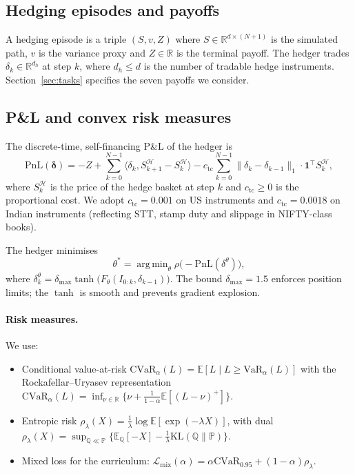 \documentclass[11pt,a4paper]{article}
\newcommand{\R}{\mathbb{R}}
\newcommand{\E}{\mathbb{E}}
\newcommand{\PP}{\mathbb{P}}
\newcommand{\QQ}{\mathbb{Q}}
\newcommand{\cvar}{\mathrm{CVaR}}
\newcommand{\VaR}{\mathrm{VaR}}
\DeclareMathOperator*{\argmin}{arg\,min}
\begin{document}
\subsection{Hedging episodes and payoffs}

A hedging episode is a triple $(S, v, Z)$ where $S\in\R^{d\times(N+1)}$ is
the simulated path, $v$ is the variance proxy and $Z\in\R$ is the terminal
payoff.  The hedger trades $\delta_k\in\R^{d_h}$ at step $k$, where
$d_h\le d$ is the number of tradable hedge instruments.  Section~\ref{sec:tasks}
specifies the seven payoffs we consider.

\subsection{P\&L and convex risk measures}

The discrete-time, self-financing P\&L of the hedger is
\begin{equation}
\mathrm{PnL}(\boldsymbol\delta) =
-Z + \sum_{k=0}^{N-1} \langle \delta_k, S_{k+1}^{\mathcal H} - S_{k}^{\mathcal H}\rangle
- c_{\mathrm{tc}} \sum_{k=0}^{N-1} \|\delta_k - \delta_{k-1}\|_1 \cdot \mathbf 1^\top S_k^{\mathcal H},
\label{eq:pnl}
\end{equation}
where $S_k^{\mathcal H}$ is the price of the hedge basket at step $k$ and
$c_{\mathrm{tc}}\ge0$ is the proportional cost.  We adopt $c_{\mathrm{tc}} = 0.001$
on US instruments and $c_{\mathrm{tc}} = 0.0018$ on Indian instruments
(reflecting STT, stamp duty and slippage in NIFTY-class books).

The hedger minimises
\begin{equation}
\theta^* = \argmin_\theta \rho\!\big(-\mathrm{PnL}(\delta^\theta)\big),
\end{equation}
where $\delta^\theta_k = \delta_{\max}\tanh\!\big(F_\theta(I_{0:k},\delta_{k-1})\big)$.
The bound $\delta_{\max}=1.5$ enforces position limits; the $\tanh$ is
smooth and prevents gradient explosion.

\paragraph{Risk measures.}  We use:
\begin{itemize}[noitemsep]
  \item Conditional value-at-risk
  $\cvar_\alpha(L) = \E[L\mid L\ge \VaR_\alpha(L)]$
  with the Rockafellar--Uryasev representation
  $\cvar_\alpha(L) = \inf_{\nu\in\R}\{\nu + \tfrac{1}{1-\alpha}\E[(L-\nu)^+]\}$.
  \item Entropic risk
  $\rho_\lambda(X) = \tfrac{1}{\lambda}\log\E[\exp(-\lambda X)]$,
  with dual $\rho_\lambda(X) = \sup_{\QQ\ll\PP}\{\E_\QQ[-X] - \tfrac{1}{\lambda}\mathrm{KL}(\QQ\|\PP)\}$.
  \item Mixed loss for the curriculum:
  $\mathcal{L}_{\mathrm{mix}}(\alpha) = \alpha \cvar_{0.95} + (1-\alpha)\rho_\lambda$.
\end{itemize}
\end{document}
